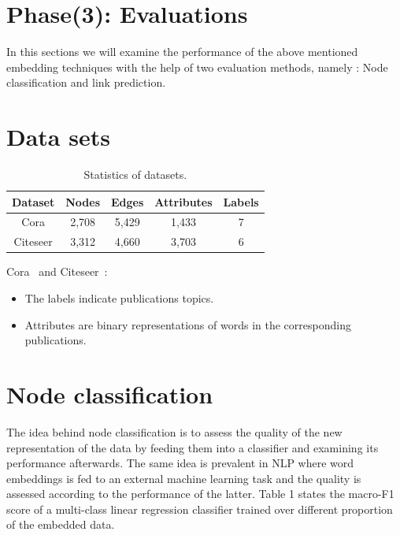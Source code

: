 \documentclass[a4paper,13pt]{article}
\newcommand\Tstrut{\rule{0pt}{3ex}}         %
\begin{document}
\section*{Phase(3): Evaluations}
In this sections we will examine the performance of the above mentioned embedding techniques with the help of two evaluation methods, namely : Node classification and link prediction.
\section{Data sets}
\begin{table}[!h]

\caption{\small Statistics of datasets.}
\label{tab:data}
\begin{center}
\small

\begin{tabular}{ccccc}
{\bf Dataset}  & {\bf Nodes } &{\bf Edges } &{\bf Attributes }&{\bf Labels }\Tstrut\\
 \hline 
 \Tstrut
Cora         & 2,708 &  5,429&  1,433 & 7\Tstrut\\
Citeseer      &3,312& 4,660 & 3,703 &  6\Tstrut\\
\end{tabular}
\end{center}
\end{table}

Cora~\cite{citeseer} and Citeseer~\cite{citeseer}:
\begin{itemize}
\item The labels indicate publications topics.
\item Attributes are binary representations of words in the corresponding publications.
\end{itemize}


\section{Node classification}
The idea behind node classification is to assess the quality of the new representation of the data by feeding them into a classifier and examining its performance afterwards. The same idea is prevalent in NLP where word embeddings is fed to an external machine learning task and the quality is assessed according to the performance of the latter. Table 1 states the macro-F1 score of a multi-class linear regression classifier trained over different proportion of the embedded data.



\end{document}
